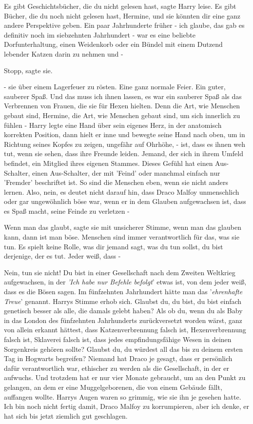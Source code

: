 \glqq Es gibt Geschichtsbücher, die du nicht gelesen hast\grqq{}, sagte Harry
leise. \glqq Es gibt Bücher, die du noch nicht gelesen hast, Hermine, und sie
könnten dir eine ganz andere Perspektive geben. Ein paar Jahrhunderte früher -
ich glaube, das gab es definitiv noch im siebzehnten Jahrhundert - war es eine
beliebte Dorfunterhaltung, einen Weidenkorb oder ein Bündel mit einem Dutzend
lebender Katzen darin zu nehmen und -\grqq{}

\glqq Stopp\grqq{}, sagte sie.

\glqq - sie über einem Lagerfeuer zu rösten. Eine ganz normale Feier. Ein guter,
sauberer Spaß. Und das muss ich ihnen lassen, es war ein sauberer Spaß als das
Verbrennen von Frauen, die sie für Hexen hielten. Denn die Art, wie Menschen
gebaut sind, Hermine, die Art, wie Menschen gebaut sind, um sich innerlich zu
fühlen -\grqq{} Harry legte eine Hand über sein eigenes Herz, in der anatomisch
korrekten Position, dann hielt er inne und bewegte seine Hand nach oben, um in
Richtung seines Kopfes zu zeigen, ungefähr auf Ohrhöhe, \glqq - ist, dass es
ihnen weh tut, wenn sie sehen, dass ihre Freunde leiden. Jemand, der sich in
ihrem Umfeld befindet, ein Mitglied ihres eigenen Stammes. Dieses Gefühl hat
einen Aus-Schalter, einen Aus-Schalter, der mit 'Feind' oder manchmal einfach
nur 'Fremder' beschriftet ist. So sind die Menschen eben, wenn sie nicht anders
lernen. Also, nein, es deutet nicht darauf hin, dass Draco Malfoy unmenschlich
oder gar ungewöhnlich böse war, wenn er in dem Glauben aufgewachsen ist, dass es
Spaß macht, seine Feinde zu verletzen -\grqq{}

\glqq Wenn man das glaubt\grqq{}, sagte sie mit unsicherer Stimme, \glqq wenn
man das glauben kann, dann ist man böse. Menschen sind immer verantwortlich für
das, was sie tun. Es spielt keine Rolle, was dir jemand sagt, was du tun sollst,
du bist derjenige, der es tut. Jeder weiß, dass -\grqq{}

\glqq Nein, tun sie nicht! Du bist in einer Gesellschaft nach dem Zweiten
Weltkrieg aufgewachsen, in der \emph{'Ich habe nur Befehle befolgt}' etwas ist,
von dem jeder weiß, dass es die Bösen sagen. Im fünfzehnten Jahrhundert hätte
man das '\emph{ehrenhafte Treue}' genannt.\grqq{} Harrys Stimme erhob sich.
\glqq Glaubst du, du bist, du bist einfach genetisch besser als alle, die damals
gelebt haben? Als ob du, wenn du als Baby in das London des fünfzehnten
Jahrhunderts zurückversetzt worden wärst, ganz von allein erkannt hättest, dass
Katzenverbrennung falsch ist, Hexenverbrennung falsch ist, Sklaverei falsch ist,
dass jedes empfindungsfähige Wesen in deinen Sorgenkreis gehören sollte? Glaubst
du, du würdest all das bis zu deinem ersten Tag in Hogwarts begreifen? Niemand
hat Draco je gesagt, dass er persönlich dafür verantwortlich war, ethischer zu
werden als die Gesellschaft, in der er aufwuchs. Und trotzdem hat er nur vier
Monate gebraucht, um an den Punkt zu gelangen, an dem er eine Muggelgeborenen,
die von einem Gebäude fällt, auffangen wollte.\grqq{} Harrys Augen waren so
grimmig, wie sie ihn je gesehen hatte. \glqq Ich bin noch nicht fertig damit,
Draco Malfoy zu korrumpieren, aber ich denke, er hat sich bis jetzt ziemlich gut
geschlagen.\grqq{}

